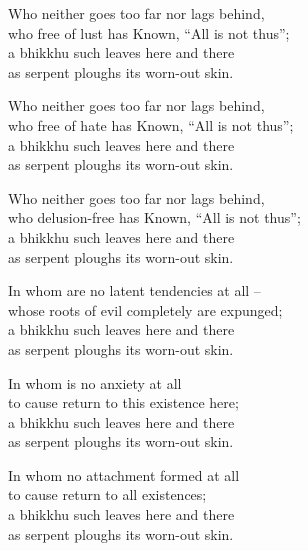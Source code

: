    \begin{MyDescription}{}
   Who neither goes too far nor lags behind,\\
   who free of lust has Known, “All is not thus”;\\
   a bhikkhu such leaves here and there\\
   as serpent ploughs its worn-out skin.
   \end{MyDescription}
   
   \begin{MyDescription}{}
   Who neither goes too far nor lags behind,\\
   who free of hate has Known, “All is not thus”;\\
   a bhikkhu such leaves here and there\\
   as serpent ploughs its worn-out skin.
   \end{MyDescription}

\begin{MyDescription}{}
Who neither goes too far nor lags behind,\\
who delusion-free has Known, “All is not thus”;\\
a bhikkhu such leaves here and there\\
as serpent ploughs its worn-out skin.
\end{MyDescription}

\begin{MyDescription}{}
   		In whom are no latent tendencies at all –\\
   		whose roots of evil completely are expunged;\\
   		a bhikkhu such leaves here and there\\
   		as serpent ploughs its worn-out skin.
   \end{MyDescription}   		

\begin{MyDescription}{}
   		In whom is no anxiety at all\\
   		   		to cause return to this existence here;\\
   		   		a bhikkhu such leaves here and there\\
   		   		as serpent ploughs its worn-out skin.
   \end{MyDescription}   
   		
\begin{MyDescription}{}
	In whom no attachment formed at all\\
   		to cause return to all existences;\\
   		a bhikkhu such leaves here and there\\
   		as serpent ploughs its worn-out skin.		
   \end{MyDescription} 
   
